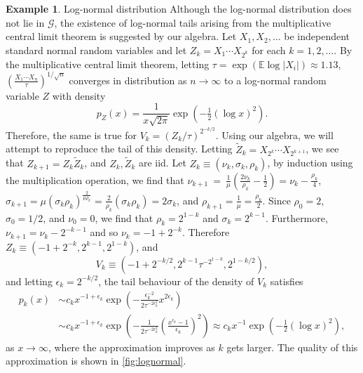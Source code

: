 \documentclass{article}
\theoremstyle{definition}
\newtheorem{example}{Example}
\begin{document}
\begin{example}{Log-normal distribution}
	Although the log-normal distribution does not lie in $\mathcal{G}$, the existence of log-normal tails arising from the multiplicative central limit theorem is suggested by our algebra. Let $X_1,X_2,\dots$ be independent standard normal random variables and let $Z_k = X_1\cdots X_{2^k}$ for each $k=1,2,\dots$. By the multiplicative central limit theorem, letting $\tau = \exp(\mathbb{E}\log |X_i|) \approx 1.13$, $\left(\frac{X_{1}\cdots X_{n}}{\tau}\right)^{1/\sqrt{n}}$ converges in distribution as $n\to\infty$ to a log-normal random variable $Z$ with density
	\[
		p_Z(x) = \frac{1}{x\sqrt{2\pi}} \exp(-\tfrac12 (\log x)^2).
	\]
	Therefore, the same is true for $V_k = (Z_k / \tau)^{2^{-k/2}}$. Using our algebra, we will attempt to reproduce the tail of this density. Letting $\tilde{Z}_k = X_{2^k} \cdots X_{2^{k+1}}$, we see that $Z_{k+1} = Z_k \tilde{Z}_k$, and $Z_k,\tilde{Z}_k$ are iid. Let $Z_k \equiv (\nu_k, \sigma_k, \rho_k)$, by induction using the multiplication operation, we find that $\nu_{k+1} ~=~\frac{1}{\mu}\left(\frac{2\nu_{k}}{\rho_{k}}-\frac{1}{2}\right)=\nu_{k}-\frac{\rho_{k}}{4}$, $\sigma_{k+1}=\mu\left(\sigma_{k}\rho_{k}\right)^{\frac{2}{\mu\rho_{k}}}=\frac{2}{\rho_{k}}\left(\sigma_{k}\rho_{k}\right)=2\sigma_{k}$, and $\rho_{k+1}=\frac{1}{\mu}=\frac{\rho_{k}}{2}$.
	Since $\rho_0 = 2$, $\sigma_0 = 1/2$, and $\nu_0 = 0$, we find that $\rho_k = 2^{1-k}$ and $\sigma_k = 2^{k-1}$. Furthermore, $\nu_{k+1} = \nu_k - 2^{-k-1}$ and so $\nu_k = -1 + 2^{-k}$. Therefore $Z_k \equiv (-1+2^{-k},2^{k-1},2^{1-k})$, and
	\[
		V_k \equiv (-1+2^{-k/2},2^{k-1}\tau^{-2^{1-k}},2^{1-k/2}),
	\]
	and letting $\epsilon_k = 2^{-k/2}$, the tail behaviour of the density of $V_k$ satisfies
	\begin{align*}
		p_k(x) & \sim c_k x^{-1+\epsilon_{k}}\exp\left(-\frac{\epsilon_{k}^{-2}}{2\tau^{-2\epsilon_{k}^{2}}}x^{2\epsilon_k}\right) \\& \sim c_k x^{-1+\epsilon_{k}}\exp\left(-\frac{1}{2\tau^{-2\epsilon_{k}^{2}}}\left(\frac{x^{\epsilon_{k}}-1}{\epsilon_{k}}\right)^{2}\right) \approx c_k x^{-1}\exp\left(-\frac{1}{2}(\log x)^2\right),
	\end{align*}
	as $x \to \infty$, where the approximation improves as $k$ gets larger. The quality of this approximation is shown in \cref{fig:lognormal}.
\end{example}
\end{document}

